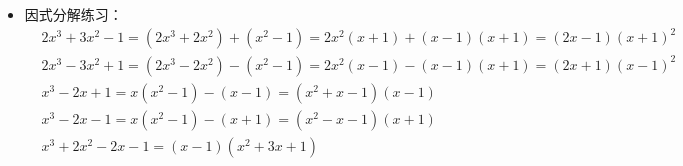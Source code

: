 \begin{itemize}[leftmargin=\inteval{\myitemleftmargin}pt,itemsep=
   \inteval{\myitemitempsep}pt,topsep=\inteval{\myitemtopsep}pt]
\item 因式分解练习：
\begin{align*}
    &  2x^3+3x^2-1=(2x^3+2x^2)+(x^2-1)=2x^2(x+1)+(x-1)(x+1)=(2x-1)(x+1)^2 \\
    &  2x^3-3x^2+1=(2x^3-2x^2)-(x^2-1)=2x^2(x-1)-(x-1)(x+1)=(2x+1)(x-1)^2 \\
    &  x^3-2x+1=x(x^2-1)-(x-1)=(x^2+x-1)(x-1) \\
    &  x^3-2x-1=x(x^2-1)-(x+1)=(x^2-x-1)(x+1) \\
    &  x^3+2x^2-2x-1=(x-1)(x^2+3x+1)
\end{align*}

\end{itemize}

